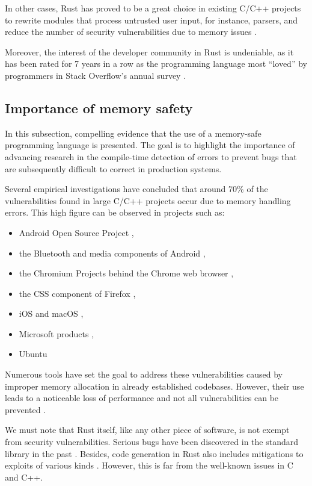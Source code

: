 In other cases, Rust has proved to be a great choice in existing C/C++ projects to rewrite modules
that process untrusted user input, for instance, parsers,
and reduce the number of security vulnerabilities due to memory issues \cite{chifflier2017writing}.

Moreover, the interest of the developer community in Rust is undeniable,
as it has been rated for 7 years in a row as the programming language most ``loved'' by programmers
in Stack Overflow's annual survey \cite{so-survey2022}.

\subsection{Importance of memory safety}

In this subsection, compelling evidence that the use of a memory-safe programming language is presented.
The goal is to highlight the importance of advancing research in the compile-time detection of errors
to prevent bugs that are subsequently difficult to correct in production systems.

Several empirical investigations have concluded that around 70\% of the vulnerabilities
found in large C/C++ projects occur due to memory handling errors.
This high figure can be observed in projects such as:

\begin{itemize}
    \item Android Open Source Project \cite{memory-bugs-android},
    \item the Bluetooth and media components of Android \cite{memory-bugs-android-media-bluetooth},
    \item the Chromium Projects behind the Chrome web browser \cite{memory-bugs-chrome},
    \item the CSS component of Firefox \cite{memory-bugs-firefox},
    \item iOS and macOS \cite{memory-bugs-ios-macos},
    \item Microsoft products \cite{miller-security-microsoft2019, memory-bugs-microsoft},
    \item Ubuntu \cite{memory-bugs-ubuntu}
\end{itemize}

Numerous tools have set the goal to address these vulnerabilities
caused by improper memory allocation in already established codebases.
However, their use leads to a noticeable loss of performance and
not all vulnerabilities can be prevented \cite{szekeres2013sok}.

We must note that Rust itself, like any other piece of software, is not exempt from security vulnerabilities.
Serious bugs have been discovered in the standard library in the past \cite{davidoff2018}.
Besides, code generation in Rust also includes mitigations to exploits of various kinds \cite[Chap. 11]{rustc-book}.
However, this is far from the well-known issues in C and C++.